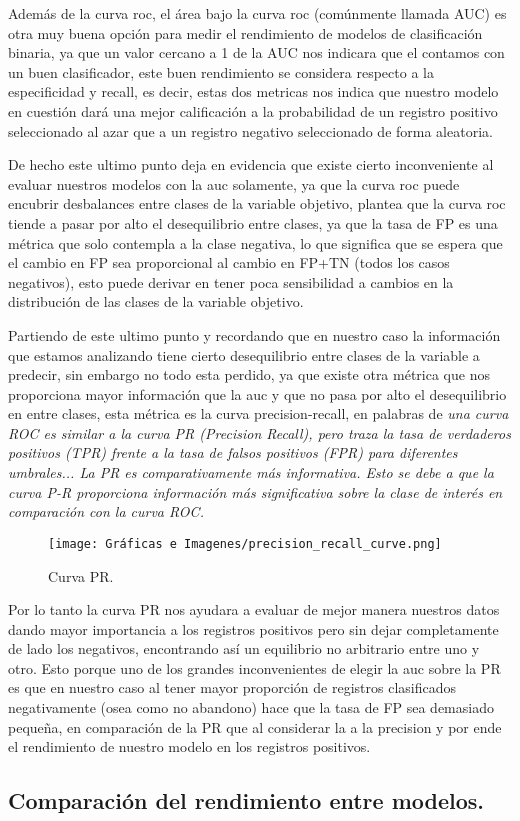 Además de la curva roc, el área bajo la curva roc (comúnmente llamada AUC) es otra muy buena opción para medir el rendimiento de modelos de clasificación binaria, ya que un valor cercano a 1 de la AUC nos indicara que el contamos con un buen clasificador, este buen rendimiento se considera respecto a la especificidad y recall, es decir, estas dos metricas nos indica que nuestro modelo en cuestión dará una mejor calificación a la probabilidad de un registro positivo seleccionado al azar que a un registro negativo seleccionado de forma aleatoria.

De hecho este ultimo punto deja en evidencia que existe cierto inconveniente al evaluar nuestros modelos con la auc solamente, ya que la curva roc puede encubrir desbalances entre clases de la variable objetivo, \cite{Chugh2023} plantea que la curva roc tiende a pasar por alto el desequilibrio entre clases, ya que la tasa de FP es una métrica que solo contempla a la clase negativa, lo que significa que se espera que el cambio en FP sea proporcional al cambio en FP+TN (todos los casos negativos), esto puede derivar en tener poca sensibilidad a cambios en la distribución de las clases de la variable objetivo.

Partiendo de este ultimo punto y recordando que en nuestro caso la información que estamos analizando tiene cierto desequilibrio entre clases de la variable a predecir, sin embargo no todo esta perdido, ya que existe otra métrica que nos proporciona mayor información que la auc y que no pasa por alto el desequilibrio en entre clases, esta métrica es la curva precision-recall, en palabras de \citet{Chugh2023} \textit{una curva ROC es similar a la curva PR (Precision Recall), pero traza la tasa de verdaderos positivos (TPR) frente a la tasa de falsos positivos (FPR) para diferentes umbrales... La PR es comparativamente más informativa. Esto se debe a que la curva P-R proporciona información más significativa sobre la clase de interés en comparación con la curva ROC.} 


\begin{figure}[h]
	\centering
	\texttt{[image: Gráficas e Imagenes/precision\_recall\_curve.png]}
	\caption{Curva PR.}
	\label{fig:CurvaPR}
\end{figure}

Por lo tanto la curva PR nos ayudara a evaluar de mejor manera nuestros datos dando mayor importancia a los registros positivos pero sin dejar completamente de lado los negativos, encontrando así un equilibrio no arbitrario entre uno y otro. Esto porque uno de los grandes inconvenientes de elegir la auc sobre la PR es que en nuestro caso al tener mayor proporción de registros clasificados negativamente (osea como no abandono) hace que la tasa de FP sea demasiado pequeña, en comparación de la PR que al considerar la a la precision y por ende el rendimiento de nuestro modelo en los registros positivos.

\subsection{Comparación del rendimiento entre modelos.}

